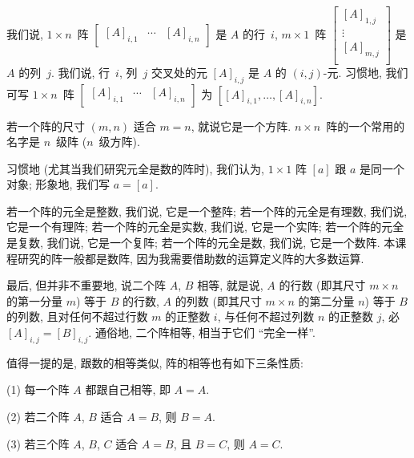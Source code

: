 \documentclass[%
    UTF8,%
    fontset=none,%
    punct=kaiming,%
    zihao=-4,%
    a4paper,%
    oneside,%
]{ctexbook}
\begin{document}
\begin{definition}[阵]
    我们说, \(1 \times n\)~阵
    \(
    \begin{bmatrix}
        [A]_{i,1} & \cdots & [A]_{i,n}
    \end{bmatrix}
    \)
    是 \(A\) 的行~\(i\),
    \(m \times 1\)~阵
    \(
    \begin{bmatrix}
        [A]_{1,j} \\
        \vdots    \\
        [A]_{m,j} \\
    \end{bmatrix}
    \)
    是 \(A\) 的列~\(j\).
    我们说,
    行~\(i\), 列~\(j\) 交叉处的元 \([A]_{i,j}\)
    是 \(A\) 的 \((i, j)\)-元.
    习惯地, 我们可写 \(1 \times n\)~阵
    \(
    \begin{bmatrix}
        [A]_{i,1} & \cdots & [A]_{i,n}
    \end{bmatrix}
    \)
    为
    \(
    [[A]_{i,1}, \dots, [A]_{i,n}].
    \)

    若一个阵的尺寸 \((m, n)\) 适合 \(m = n\),
    就说它是一个方阵.
    \(n \times n\)~阵的一个常用的名字是 \(n\)~级阵
    (\(n\)~级方阵).

    习惯地 (尤其当我们研究元全是数的阵时),
    我们认为, \(1 \times 1\) 阵 \([a]\)
    跟 \(a\) 是同一个对象;
    形象地, 我们写 \(a = [a]\).

    若一个阵的元全是整数, 我们说, 它是一个整阵;
    若一个阵的元全是有理数, 我们说, 它是一个有理阵;
    若一个阵的元全是实数, 我们说, 它是一个实阵;
    若一个阵的元全是复数, 我们说, 它是一个复阵;
    若一个阵的元全是数, 我们说, 它是一个数阵.
    本课程研究的阵一般都是数阵,
    因为我需要借助数的运算定义阵的大多数运算.

    最后, 但并非不重要地, 说二个阵 \(A\), \(B\) 相等,
    就是说,
    \(A\) 的行数 (即其尺寸 \(m \times n\) 的第一分量 \(m\))
    等于 \(B\) 的行数,
    \(A\) 的列数 (即其尺寸 \(m \times n\) 的第二分量 \(n\))
    等于 \(B\) 的列数,
    且对任何不超过行数 \(m\) 的正整数 \(i\),
    与任何不超过列数 \(n\) 的正整数 \(j\),
    必 \([A]_{i,j} = [B]_{i,j}\).
    通俗地, 二个阵相等, 相当于它们 ``完全一样''.
\end{definition}

值得一提的是, 跟数的相等类似,
阵的相等也有如下三条性质:

(1)
每一个阵 \(A\) 都跟自己相等, 即 \(A = A\).

(2)
若二个阵 \(A\), \(B\) 适合 \(A = B\), 则 \(B = A\).

(3)
若三个阵 \(A\), \(B\), \(C\) 适合 \(A = B\), 且 \(B = C\),
则 \(A = C\).
\end{document}

